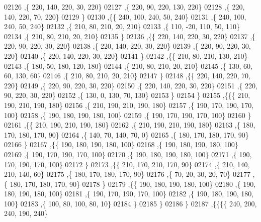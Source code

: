 \begin{DoxyCode}
02126     ,\{   220,   140,   220,    30,   220\}
02127     ,\{   220,    90,   220,   130,   220\}
02128     ,\{   220,   140,   220,    70,   220\}
02129     \}
02130    ,\{\{   240,   100,   240,    50,   240\}
02131     ,\{   240,   100,   240,    50,   240\}
02132     ,\{   210,    80,   210,    20,   210\}
02133     ,\{   110,   -20,   110,    50,   110\}
02134     ,\{   210,    80,   210,    20,   210\}
02135     \}
02136    ,\{\{   220,   140,   220,    30,   220\}
02137     ,\{   220,    90,   220,    30,   220\}
02138     ,\{   220,   140,   220,    30,   220\}
02139     ,\{   220,    90,   220,    30,   220\}
02140     ,\{   220,   140,   220,    30,   220\}
02141     \}
02142    ,\{\{   210,    80,   210,   130,   210\}
02143     ,\{   180,    50,   180,   120,   180\}
02144     ,\{   210,    80,   210,    20,   210\}
02145     ,\{   130,    60,    60,   130,    60\}
02146     ,\{   210,    80,   210,    20,   210\}
02147     \}
02148    ,\{\{   220,   140,   220,    70,   220\}
02149     ,\{   220,    90,   220,    30,   220\}
02150     ,\{   220,   140,   220,    30,   220\}
02151     ,\{   220,    90,   220,    30,   220\}
02152     ,\{   130,     0,   130,    70,   130\}
02153     \}
02154    \}
02155   ,\{\{\{   210,   190,   210,   190,   180\}
02156     ,\{   210,   190,   210,   190,   180\}
02157     ,\{   190,   170,   190,   170,   100\}
02158     ,\{   190,   180,   190,   180,   100\}
02159     ,\{   190,   170,   190,   170,   100\}
02160     \}
02161    ,\{\{   210,   190,   210,   190,   180\}
02162     ,\{   210,   190,   210,   190,   180\}
02163     ,\{   180,   170,   180,   170,    90\}
02164     ,\{   140,    70,   140,    70,     0\}
02165     ,\{   180,   170,   180,   170,    90\}
02166     \}
02167    ,\{\{   190,   180,   190,   180,   100\}
02168     ,\{   190,   180,   190,   180,   100\}
02169     ,\{   190,   170,   190,   170,   100\}
02170     ,\{   190,   180,   190,   180,   100\}
02171     ,\{   190,   170,   190,   170,   100\}
02172     \}
02173    ,\{\{   210,   170,   210,   170,    90\}
02174     ,\{   210,   140,   210,   140,    60\}
02175     ,\{   180,   170,   180,   170,    90\}
02176     ,\{    70,    20,    30,    20,    70\}
02177     ,\{   180,   170,   180,   170,    90\}
02178     \}
02179    ,\{\{   190,   180,   190,   180,   100\}
02180     ,\{   190,   180,   190,   180,   100\}
02181     ,\{   190,   170,   190,   170,   100\}
02182     ,\{   190,   180,   190,   180,   100\}
02183     ,\{   100,    80,   100,    80,    10\}
02184     \}
02185    \}
02186   \}
02187  ,\{\{\{\{   240,   200,   240,   190,   240\}

\end{DoxyCode}
